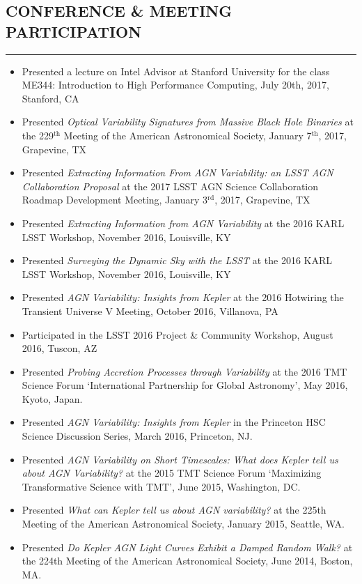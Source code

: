 \documentclass[10pt,a4]{article}
\begin{document}
\subsection*{CONFERENCE \& MEETING PARTICIPATION}
\hrule  height 4pt
\vspace{0.2cm}
\begin{itemize}
    \item Presented a lecture on Intel Advisor at Stanford University for the class ME344: Introduction to High Performance Computing, July 20th, 2017, Stanford, CA
    \item Presented {\it Optical Variability Signatures from Massive Black Hole Binaries} at the 229$^{\mathrm{th}}$ Meeting of the American Astronomical Society, January 7$^{\mathrm{th}}$, 2017, Grapevine, TX
    \item Presented {\it Extracting Information From AGN Variability: an LSST AGN Collaboration Proposal} at the 2017 LSST AGN Science Collaboration Roadmap Development Meeting, January 3$^{\mathrm{rd}}$, 2017, Grapevine, TX
    \item Presented {\it Extracting Information from AGN Variability} at the 2016 KARL LSST Workshop, November 2016, Louisville, KY
    \item Presented {\it Surveying the Dynamic Sky with the LSST} at the 2016 KARL LSST Workshop, November 2016, Louisville, KY
    \item Presented {\it AGN Variability: Insights from Kepler} at the 2016 Hotwiring the Transient Universe V Meeting, October 2016, Villanova, PA
    \item Participated in the LSST 2016 Project \& Community Workshop, August 2016, Tuscon, AZ
    \item Presented {\it Probing Accretion Processes through Variability} at the 2016 TMT Science Forum `International Partnership for Global Astronomy', May 2016, Kyoto, Japan.
    \item Presented {\it AGN Variability: Insights from Kepler} in the Princeton HSC Science Discussion Series, March 2016, Princeton, NJ.
    \item Presented {\it AGN Variability on Short Timescales: What does Kepler tell us about AGN Variability?} at the 2015 TMT Science Forum `Maximizing Transformative Science with TMT', June 2015, Washington, DC.
    \item Presented {\it What can Kepler tell us about AGN variability?} at the 225th Meeting of the American Astronomical Society, January 2015, Seattle, WA.
    \item Presented {\it Do Kepler AGN Light Curves Exhibit a Damped Random Walk?} at the 224th Meeting of the American Astronomical Society, June 2014, Boston, MA.

\end{itemize}
\end{document}

